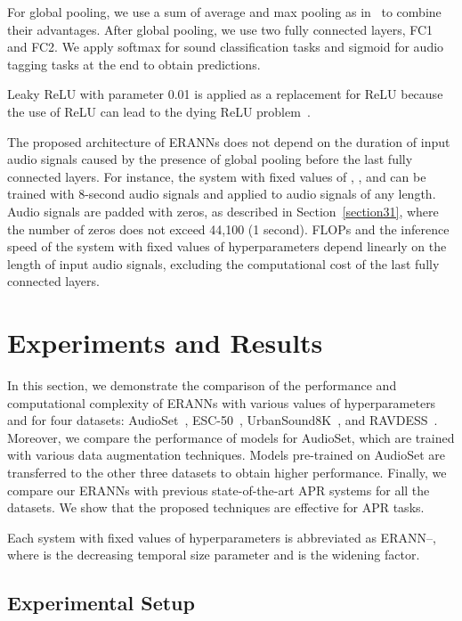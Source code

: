 \documentclass{article}
\begin{document}
\begin{sloppy}
For global pooling, we use a sum of average and max pooling as in~\cite{9229505} to combine their advantages. After global pooling, we use two fully connected layers, FC1 and FC2. We apply softmax for sound classification tasks and sigmoid for audio tagging tasks at the end to obtain predictions. 

Leaky ReLU with parameter 0.01 is applied as a replacement for ReLU because the use of ReLU can lead to the dying ReLU problem~\cite{Lu_2020}.

The proposed architecture of ERANNs does not depend on the duration of input audio signals caused by the presence of global pooling before the last fully connected layers. For instance, the system with fixed values of , , and  can be trained with 8-second audio signals and applied to audio signals of any length. Audio signals are padded with zeros, as described in Section~\ref{section31}, where the number of zeros does not exceed 44,100 (1 second). FLOPs and the inference speed of the system with fixed values of hyperparameters depend linearly on the length of input audio signals, excluding the computational cost of the last fully connected layers.


\section{Experiments and Results}
\label{section4}

In this section, we demonstrate the comparison of the performance and computational complexity of ERANNs with various values of hyperparameters  and  for four datasets: AudioSet~\cite{7952261}, ESC-50~\cite{10.1145/2733373.2806390}, UrbanSound8K~\cite{10.1145/2647868.2655045}, and RAVDESS~\cite{Livingstone2018TheRA}. Moreover, we compare the performance of models for AudioSet, which are trained with various data augmentation techniques. Models pre-trained on AudioSet are transferred to the other three datasets to obtain higher performance. Finally, we compare our ERANNs with previous state-of-the-art APR systems for all the datasets. We show that the proposed techniques are effective for APR tasks.

Each system with fixed values of hyperparameters is abbreviated as ERANN--, where  is the decreasing temporal size parameter and  is the widening factor. 


\subsection{Experimental Setup}


\end{sloppy}
\end{document}
